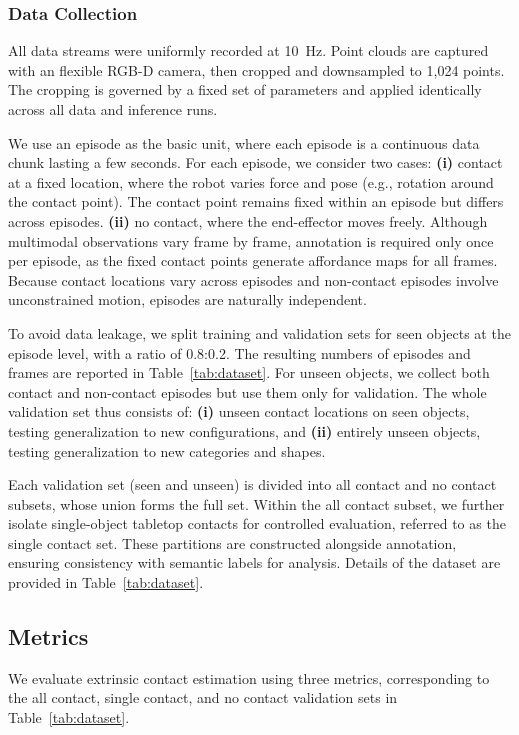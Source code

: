 \documentclass[letterpaper, 10 pt, conference]{ieeeconf}  %
\begin{document}
\subsubsection{Data Collection}\label{sec:data_collection_exp}

All data streams were uniformly recorded at \SI{10}{\hertz}. Point clouds are captured with an flexible RGB-D camera, then cropped and downsampled to 1,024 points. The cropping is governed by a fixed set of parameters and applied identically across all data and inference runs. 

We use an episode as the basic unit, where each episode is a continuous data chunk lasting a few seconds. For each episode, we consider two cases: \textbf{(i)} contact at a fixed location, where the robot varies force and pose (e.g., rotation around the contact point). The contact point remains fixed within an episode but differs across episodes. \textbf{(ii)} no contact, where the end-effector moves freely. Although multimodal observations vary frame by frame, annotation is required only once per episode, as the fixed contact points generate affordance maps for all frames. Because contact locations vary across episodes and non-contact episodes involve unconstrained motion, episodes are naturally independent.

 To avoid data leakage, we split training and validation sets for seen objects at the episode level, with a ratio of 0.8:0.2. The resulting numbers of episodes and frames are reported in Table~\ref{tab:dataset}. For unseen objects, we collect both contact and non-contact episodes but use them only for validation. The whole validation set thus consists of: \textbf{(i)} unseen contact locations on seen objects, testing generalization to new configurations, and \textbf{(ii)} entirely unseen objects, testing generalization to new categories and shapes.

Each validation set (seen and unseen) is divided into all contact and no contact subsets, whose union forms the full set. Within the all contact subset, we further isolate single-object tabletop contacts for controlled evaluation, referred to as the single contact set. These partitions are constructed alongside annotation, ensuring consistency with semantic labels for analysis. Details of the dataset are provided in Table~\ref{tab:dataset}.

\subsection{Metrics}
We evaluate extrinsic contact estimation using three metrics, corresponding to the all contact, single contact, and no contact validation sets in Table~\ref{tab:dataset}.
\end{document}
